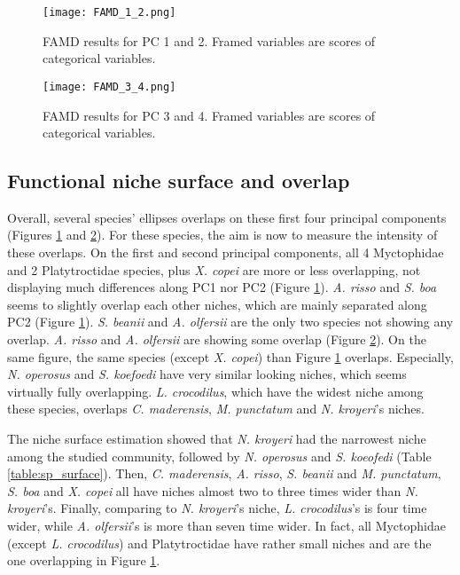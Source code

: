 \begin{figure} [!htbp]
	\begin{center}
		\texttt{[image: FAMD\_1\_2.png]}
	\end{center}
	\caption[FAMD results for first and second axis]{FAMD results for PC 1 and 2. Framed variables are scores of categorical variables.}
	\label{fig:famd12}
\end{figure}

\begin{figure} [!htbp]
	\begin{center}
		\texttt{[image: FAMD\_3\_4.png]}
	\end{center}
	\caption[FAMD results for third and fourth axis]{FAMD results for PC 3 and 4. Framed variables are scores of categorical variables.}
	\label{fig:famd34}
\end{figure}


\subsection{Functional niche surface and overlap}
Overall, several species' ellipses overlaps on these first four principal components (Figures \ref{fig:famd12} and \ref{fig:famd34}). For these species, the aim is now to measure the intensity of these overlaps. On the first and second principal components, all 4 Myctophidae and 2 Platytroctidae species, plus \textit{X. copei} are more or less overlapping, not displaying much differences along PC1 nor PC2 (Figure \ref{fig:famd12}). \textit{A. risso} and \textit{S. boa} seems to slightly overlap each other niches, which are mainly separated along PC2 (Figure \ref{fig:famd12}). \textit{S. beanii} and \textit{A. olfersii} are the only two species not showing any overlap. 
\textit{A. risso} and \textit{A. olfersii} are showing some overlap (Figure \ref{fig:famd34}). On the same figure, the same species (except \textit{X. copei}) than Figure \ref{fig:famd12} overlaps. Especially, \textit{N. operosus} and \textit{S. koefoedi} have very similar looking niches, which seems virtually fully overlapping. \textit{L. crocodilus}, which have the widest niche among these species, overlaps \textit{C. maderensis}, \textit{M. punctatum} and \textit{N. kroyeri}'s niches. 

The niche surface estimation showed that \textit{N. kroyeri} had the narrowest niche among the studied community, followed by \textit{N. operosus} and \textit{S. koeofedi} (Table \ref{table:sp_surface}). Then, \textit{C. maderensis}, \textit{A. risso}, \textit{S. beanii} and \textit{M. punctatum}, \textit{S. boa} and \textit{X. copei} all have niches almost two to three times wider than \textit{N. kroyeri}'s. Finally, comparing to \textit{N. kroyeri}'s niche, \textit{L. crocodilus}'s is four time wider, while \textit{A. olfersii}'s is more than seven time wider. In fact, all Myctophidae (except \textit{L. crocodilus}) and Platytroctidae have rather small niches and are the one overlapping in Figure \ref{fig:famd12}.

